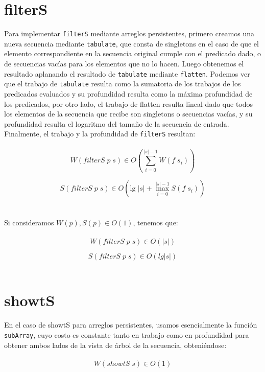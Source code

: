 \documentclass[a4paper,10pt]{article}
\begin{document}
	\section*{\Large filterS}
		Para implementar \texttt{filterS} mediante arreglos persistentes, primero creamos una nueva secuencia mediante \texttt{tabulate}, que consta de singletons en el caso de que el elemento correspondiente en la secuencia original cumple con el predicado dado, o de secuencias vacías para los elementos que no lo hacen. Luego obtenemos el resultado aplanando el resultado de \texttt{tabulate} mediante \texttt{flatten}. Podemos ver que el trabajo de \texttt{tabulate} resulta como la sumatoria de los trabajos de los predicados evaluados y su profundidad resulta como la máxima profundidad de los predicados, por otro lado, el trabajo de flatten resulta lineal dado que todos los elementos de la secuencia que recibe son singletons o secuencias vacías, y su profundidad resulta el logaritmo del tamaño de la secuencia de entrada.
		Finalmente, el trabajo y la profundidad de \texttt{filterS} resultan: 
\\
\\	
	\begin{equation*}
		W \left( filterS \; p \; s \right) \in
		O \left(  \sum_{i=0}^{\vert s \vert -1} W(f \; s_i) \right)
	\end{equation*}

	\begin{equation*}
		S \left( filterS \; p \; s \right) \in
		O \left( \text{lg} \; \vert s \vert + \max_{i=0}^{\vert s \vert -1} S(f \; s_i) \right)
	\end{equation*}
\\
\\
		Si consideramos $W(p), S(p) \in O(1)$, tenemos que:
\\
\\
		\begin{equation*}
			W \left( filterS \;p \;s \right) \in O \left( \vert s \vert \right)
		\end{equation*}
		
		\begin{equation*}
			S \left( filterS \;p \;s \right) \in O \left( lg\vert s \vert \right)
		\end{equation*}
\\
	\section*{\Large showtS}
		En el caso de showtS para arreglos persistentes, usamos esencialmente la función \texttt{subArray}, cuyo costo es constante tanto en trabajo como en profundidad para obtener ambos lados de la vista de árbol de la secuencia, obteniéndose:
\\
\\
		\begin{equation*}
			W\left( showtS \; s \right) \in O\left( 1 \right)
		\end{equation*}		
		
\end{document}
